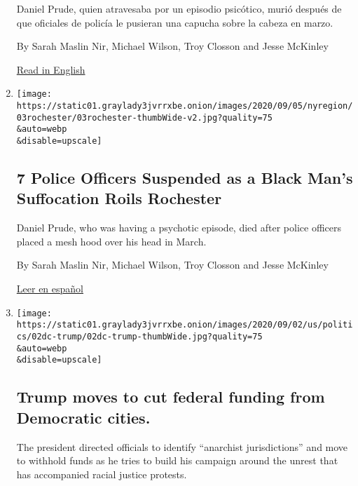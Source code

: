 \begin{enumerate}
  Daniel Prude, quien atravesaba por un episodio psicótico, murió
  después de que oficiales de policía le pusieran una capucha sobre la
  cabeza en marzo.

  By Sarah Maslin Nir, Michael Wilson, Troy Closson and Jesse McKinley

  \href{https://www.nytimes3xbfgragh.onion/2020/09/03/nyregion/daniel-prude-police-rochester.html}{Read
  in English}
\item
  \href{/2020/09/03/nyregion/daniel-prude-police-rochester.html}{}

  \texttt{[image: https://static01.graylady3jvrrxbe.onion/images/2020/09/05/nyregion/03rochester/03rochester-thumbWide-v2.jpg?quality=75\\\&auto=webp\\\&disable=upscale]}

  \hypertarget{7-police-officers-suspended-as-a-black-mans-suffocation-roils-rochester}{%
  \subsection{7 Police Officers Suspended as a Black Man's Suffocation
  Roils
  Rochester}\label{7-police-officers-suspended-as-a-black-mans-suffocation-roils-rochester}}

  Daniel Prude, who was having a psychotic episode, died after police
  officers placed a mesh hood over his head in March.

  By Sarah Maslin Nir, Michael Wilson, Troy Closson and Jesse McKinley

  \href{https://www.nytimes3xbfgragh.onion/es/2020/09/04/espanol/estados-unidos/daniel-prude-rochester-policia.html}{Leer
  en español}
\item
  \href{/2020/09/03/us/elections/trump-moves-to-cut-federal-funding-from-democratic-cities.html}{}

  \texttt{[image: https://static01.graylady3jvrrxbe.onion/images/2020/09/02/us/politics/02dc-trump/02dc-trump-thumbWide.jpg?quality=75\\\&auto=webp\\\&disable=upscale]}

  \hypertarget{trump-moves-to-cut-federal-funding-from-democratic-cities}{%
  \subsection{Trump moves to cut federal funding from Democratic
  cities.}\label{trump-moves-to-cut-federal-funding-from-democratic-cities}}

  The president directed officials to identify ``anarchist
  jurisdictions'' and move to withhold funds as he tries to build his
  campaign around the unrest that has accompanied racial justice
  protests.


\end{enumerate}
